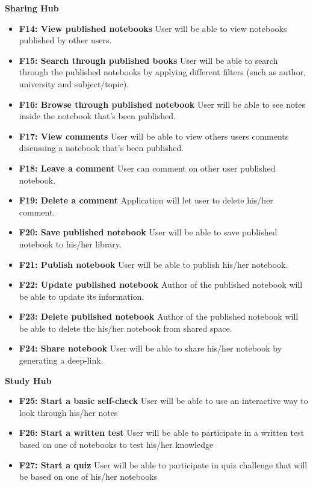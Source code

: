 \documentclass[thesis=B,english]{FITthesis}[2012/10/20]
\begin{document}
\bigskip
\textbf{Sharing Hub}
\begin{itemize}
	\item \textbf{F14: View published notebooks} User will be able to view notebooks published by other users.
	\item \textbf{F15: Search through published books} User will be able to search through the published notebooks by applying different filters (such as author, university and subject/topic).
	\item \textbf{F16: Browse through published notebook} User will be able to see notes inside the notebook that's been published.
	\item \textbf{F17: View comments} User will be able to view others users comments discussing a notebook that's been published.
	\item \textbf{F18: Leave a comment} User can comment on other user published notebook.
	\item \textbf{F19: Delete a comment} Application will let user to delete his/her comment.
	\item \textbf{F20: Save published notebook} User will be able to save published notebook to his/her library.
	\item \textbf{F21: Publish notebook} User will be able to publish his/her notebook.
	\item \textbf{F22: Update published notebook} Author of the published notebook will be able to update its information.
	\item \textbf{F23: Delete published notebook} Author of the published notebook will be able to delete the his/her notebook from shared space.
	\item \textbf{F24: Share notebook} User will be able to share his/her notebook by generating a deep-link.
 \end{itemize}

\bigskip
\textbf{Study Hub}
\begin{itemize}
	\item \textbf{F25: Start a basic self-check} User will be able to use an interactive way to look through his/her notes
	\item \textbf{F26: Start a written test} User will be able to participate in a written test based on one of notebooks to test his/her knowledge
	\item \textbf{F27: Start a quiz} User will be able to participate in quiz challenge that will be based on one of his/her notebooks
	
\end{itemize}
\end{document}
